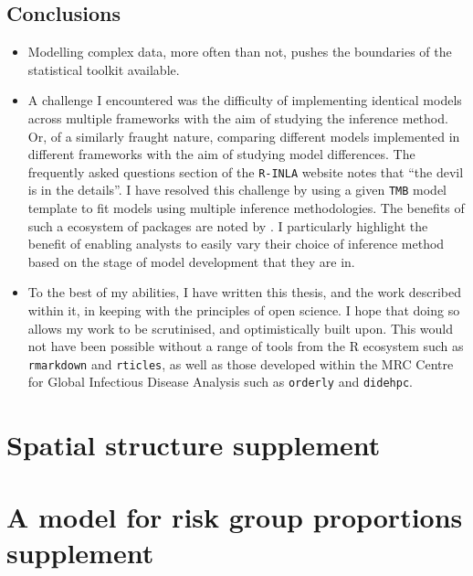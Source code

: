\documentclass[a4paper, nobind]{templates/ociamthesis}
\providecommand{\tightlist}{%
  \setlength{\itemsep}{0pt}\setlength{\parskip}{0pt}}
\begin{document}
\hypertarget{conclusions-1}{%
\section{Conclusions}\label{conclusions-1}}

\begin{itemize}
\tightlist
\item
  Modelling complex data, more often than not, pushes the boundaries of the statistical toolkit available.
\item
  A challenge I encountered was the difficulty of implementing identical models across multiple frameworks with the aim of studying the inference method. Or, of a similarly fraught nature, comparing different models implemented in different frameworks with the aim of studying model differences. The frequently asked questions section of the \texttt{R-INLA} website \autocite{rinla2023faq} notes that ``the devil is in the details''. I have resolved this challenge by using a given \texttt{TMB} model template to fit models using multiple inference methodologies. The benefits of such a ecosystem of packages are noted by \textcite{stringer2021fields}. I particularly highlight the benefit of enabling analysts to easily vary their choice of inference method based on the stage of model development that they are in.
\item
  To the best of my abilities, I have written this thesis, and the work described within it, in keeping with the principles of open science. I hope that doing so allows my work to be scrutinised, and optimistically built upon. This would not have been possible without a range of tools from the R ecosystem such as \texttt{rmarkdown} and \texttt{rticles}, as well as those developed within the MRC Centre for Global Infectious Disease Analysis such as \texttt{orderly} and \texttt{didehpc}.
\end{itemize}

\startappendices

\hypertarget{spatial-structure-supplement}{%
\chapter{Spatial structure supplement}\label{spatial-structure-supplement}}

\hypertarget{a-model-for-risk-group-proportions-supplement}{%
\chapter{A model for risk group proportions supplement}\label{a-model-for-risk-group-proportions-supplement}}
\end{document}
